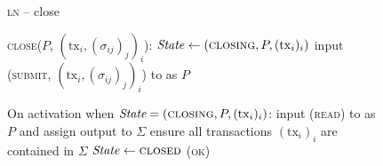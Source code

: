 \begin{figure}[H]
  \begin{processbox}{\textsc{ln} -- close}
    \begin{algorithmic}[1]
      \State \textsc{close}($P$, $(\mathrm{tx}_i, (\sigma_{ij})_j)_i$):
      \Indent
        \State {}
        \State $\mathit{State} \gets (\textsc{closing}, P, (\mathrm{tx}_i)_i)$
        \State input (\textsc{submit}, $(\mathrm{tx}_i, (\sigma_{ij})_j)_i$)
        to \ledger as $P$
      \EndIndent
      \Statex

      \State On activation when $\textit{State} = (\textsc{closing}, P,
      (\mathrm{tx}_i)_i)$:
      \Indent
        \State input (\textsc{read}) to \ledger as $P$ and assign output to
        $\Sigma$
        \State ensure all transactions $(\mathrm{tx}_i)_i$ are contained in
        $\Sigma$
        \State $\mathit{State} \gets \textsc{closed}$
        \State \Return (\textsc{ok})
      \EndIndent
    \end{algorithmic}
  \end{processbox}
  \caption{}
  \label{code:ln:virtual}
\end{figure}
